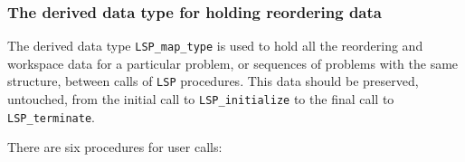 \documentclass{galahad}
\newcommand{\packagename}{LSP}
\begin{document}

\subsubsection{The derived data type for holding reordering data}\label{typemap}
The derived data type 
{\tt \packagename\_map\_type} 
is used to hold all the reordering and workspace data for a particular 
problem, or sequences of problems with the same structure, between calls of 
{\tt \packagename} procedures. 
This data should be preserved, untouched, from the initial call to 
{\tt \packagename\_initialize}
to the final call to
{\tt \packagename\_terminate}.


\galarguments
There are six procedures for user calls:
\end{document}
